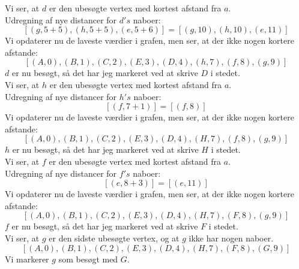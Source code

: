 \documentclass[a4paper,12pt]{article}
\begin{document}
Vi ser, at $d$ er den ubesøgte vertex med kortest afstand fra $a$.\\
Udregning af nye distancer for $d's$ naboer:
\[
[(g,5+5),(h,5+5),(e,5+6)] = [(g,10),(h,10),(e,11)]
\]
Vi opdaterer nu de laveste værdier i grafen, men ser, at der ikke nogen kortere afstande:
\[
[(A,0),(B,1),(C,2),(E,3),(D,4),(h,7),(f,8),(g,9)]
\]
$d$ er nu besøgt, så det har jeg markeret ved at skrive $D$ i stedet.\\

Vi ser, at $h$ er den ubesøgte vertex med kortest afstand fra $a$.\\
Udregning af nye distancer for $h's$ naboer:
\[
[(f,7+1)] = [(f,8)]
\]
Vi opdaterer nu de laveste værdier i grafen, men ser, at der ikke nogen kortere afstande:
\[
[(A,0),(B,1),(C,2),(E,3),(D,4),(H,7),(f,8),(g,9)]
\]
$h$ er nu besøgt, så det har jeg markeret ved at skrive $H$ i stedet.\\

Vi ser, at $f$ er den ubesøgte vertex med kortest afstand fra $a$.\\
Udregning af nye distancer for $f's$ naboer:
\[
[(e,8+3)] = [(e,11)]
\]
Vi opdaterer nu de laveste værdier i grafen, men ser, at der ikke nogen kortere afstande:
\[
[(A,0),(B,1),(C,2),(E,3),(D,4),(H,7),(F,8),(g,9)]
\]
$f$ er nu besøgt, så det har jeg markeret ved at skrive $F$ i stedet.\\

Vi ser, at $g$ er den sidste ubesøgte vertex, og at $g$ ikke har nogen naboer.\\
\[
[(A,0),(B,1),(C,2),(E,3),(D,4),(H,7),(F,8),(G,9)]
\]
Vi markerer $g$ som besøgt med $G$.

\subsection[]{}



\subsection[]{}



\subsection[]{}
\end{document}
